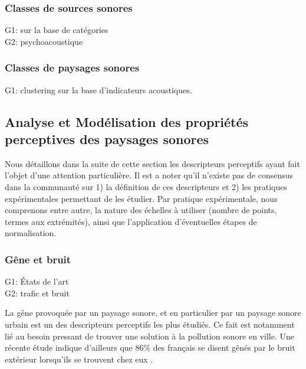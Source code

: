 \subsubsection{Classes de sources sonores}

G1: \citep{niessen2010categories,park14} sur la base de catégories\\
G2: \citep{yang2013psychoacoustical} psychoacoustique

\subsubsection{Classes de paysages sonores}

G1: \citep{rychtarikova2013soundscape,torija2013application} clustering sur la base d'indicateurs acoustiques.

\subsection{Analyse et Modélisation des propriétés perceptives des paysages sonores}
\label{sec:descripteursPercetifs}

Nous détaillons dans la suite de cette section les descripteurs perceptifs ayant fait l'objet d'une attention particulière. Il est a noter qu'il n'existe pas de consensus dans la communauté sur 1) la définition de ces descripteurs et 2) les pratiques expérimentales permettant de les étudier. Par pratique expérimentale, nous comprenons entre autre, la nature des échelles à utiliser (nombre de points, termes aux extrémités), ainsi que l'application d'éventuelles étapes de normalisation. 

\subsubsection{Gêne et bruit}

G1: \citep{marquis2005noisea,marquis2005noiseb} États de l'art\\
G2: \citep{gille2016testing,gille2016noise,gille2016dose,morel2016noise,trolle2015perception,marquis2015simulated,klein2015spectral} trafic et  bruit 

La gêne provoquée par un paysage sonore, et en particulier par un paysage sonore urbain est un des descripteurs perceptifs les plus étudiés. Ce fait est notamment lié au besoin pressant de trouver une solution à la pollution sonore en ville. Une récente étude indique d'ailleurs que 86\% des français se disent gênés par le bruit extérieur lorsqu'ils se trouvent chez eux \citep{noiseFrench}. \\

